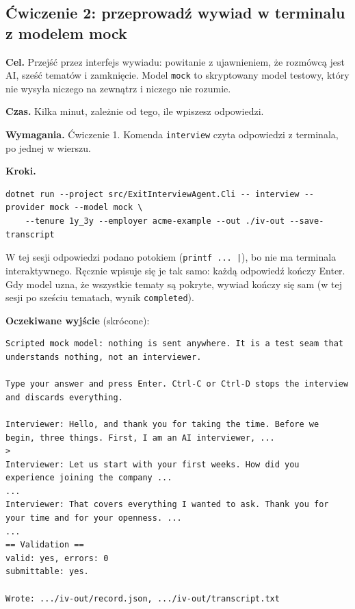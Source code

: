 {\subsection{Ćwiczenie 2: przeprowadź wywiad w terminalu z modelem mock}

\textbf{Cel.} Przejść przez interfejs wywiadu: powitanie z ujawnieniem, że
rozmówcą jest AI, sześć tematów i zamknięcie. Model \texttt{mock} to skryptowany
model testowy, który nie wysyła niczego na zewnątrz i niczego nie rozumie.

\textbf{Czas.} Kilka minut, zależnie od tego, ile wpiszesz odpowiedzi.

\textbf{Wymagania.} Ćwiczenie 1. Komenda \texttt{interview} czyta odpowiedzi
z terminala, po jednej w wierszu.

\textbf{Kroki.}

\begin{Verbatim}[fontsize=\scriptsize,frame=single,framesep=2mm]
dotnet run --project src/ExitInterviewAgent.Cli -- interview --provider mock --model mock \
    --tenure 1y_3y --employer acme-example --out ./iv-out --save-transcript
\end{Verbatim}

W tej sesji odpowiedzi podano potokiem (\texttt{printf ... |}), bo nie ma
terminala interaktywnego. Ręcznie wpisuje się je tak samo: każdą odpowiedź
kończy Enter. Gdy model uzna, że wszystkie tematy są pokryte, wywiad kończy się
sam (w tej sesji po sześciu tematach, wynik \texttt{completed}).

\textbf{Oczekiwane wyjście} (skrócone):

\begin{Verbatim}[fontsize=\scriptsize,frame=single,framesep=2mm]
Scripted mock model: nothing is sent anywhere. It is a test seam that understands nothing, not an interviewer.

Type your answer and press Enter. Ctrl-C or Ctrl-D stops the interview and discards everything.

Interviewer: Hello, and thank you for taking the time. Before we begin, three things. First, I am an AI interviewer, ...
>
Interviewer: Let us start with your first weeks. How did you experience joining the company ...
...
Interviewer: That covers everything I wanted to ask. Thank you for your time and for your openness. ...
...
== Validation ==
valid: yes, errors: 0
submittable: yes.

Wrote: .../iv-out/record.json, .../iv-out/transcript.txt
\end{Verbatim}

}

